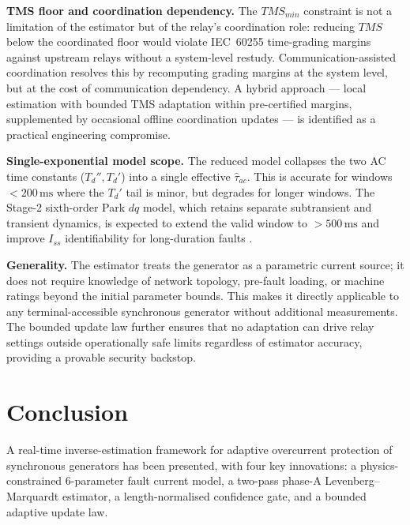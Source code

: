 \documentclass[journal, twoside, 10pt]{IEEEtran}
\begin{document}
\textbf{TMS floor and coordination dependency.}
The $TMS_{min}$ constraint is not a limitation of the estimator but of the
relay's coordination role: reducing $TMS$ below the coordinated floor would
violate IEC~60255 time-grading margins against upstream relays without a
system-level restudy.  Communication-assisted coordination
\cite{Oudalov2009,Saleh2017} resolves this by recomputing grading margins
at the system level, but at the cost of communication dependency.  A hybrid
approach --- local estimation with bounded TMS adaptation within pre-certified
margins, supplemented by occasional offline coordination updates --- is
identified as a practical engineering compromise.

\textbf{Single-exponential model scope.}
The reduced model collapses the two AC time constants ($T_d'', T_d'$) into
a single effective $\hat{\tau}_{ac}$.  This is accurate for windows
$< 200\,\text{ms}$ where the $T_d'$ tail is minor, but degrades for longer
windows.  The Stage-2 sixth-order Park $dq$ model, which retains separate
subtransient and transient dynamics, is expected to extend the valid window to
$> 500\,\text{ms}$ and improve $I_{ss}$ identifiability for long-duration
faults \cite{IEEE1110}.

\textbf{Generality.}
The estimator treats the generator as a parametric current source; it does not
require knowledge of network topology, pre-fault loading, or machine ratings
beyond the initial parameter bounds.  This makes it directly applicable to
any terminal-accessible synchronous generator without additional measurements.
The bounded update law further ensures that no adaptation can drive relay
settings outside operationally safe limits regardless of estimator accuracy,
providing a provable security backstop.

\section{Conclusion}
\label{sec:conclusion}

A real-time inverse-estimation framework for adaptive overcurrent protection
of synchronous generators has been presented, with four key innovations: a
physics-constrained 6-parameter fault current model, a two-pass phase-A
Levenberg--Marquardt estimator, a length-normalised confidence gate, and a
bounded adaptive update law.
\end{document}
